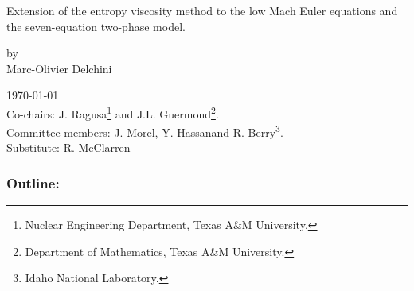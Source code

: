 \documentclass[xcolor=dvipsnames,10pt]{beamer}
\begin{document}
%
\begin{frame}
\begin{center}
Extension of the entropy viscosity method to the low Mach Euler equations and the seven-equation two-phase model.
\begin{center}
by \\
Marc-Olivier Delchini
\end{center}
\today \\

Co-chairs: J. Ragusa\footnote{Nuclear Engineering Department, Texas A\&M University.} and J.L. Guermond\footnote{Department of Mathematics, Texas A\&M University.}. \\
Committee members: J. Morel\footnotemark[1], Y. Hassan\footnotemark[1] and R. Berry\footnote{Idaho National Laboratory.}. \\
Substitute: R. McClarren
\end{center}
\end{frame}
%
\begin{frame}
	\frametitle{Outline:}
	\tableofcontents
\end{frame}
\end{document}
